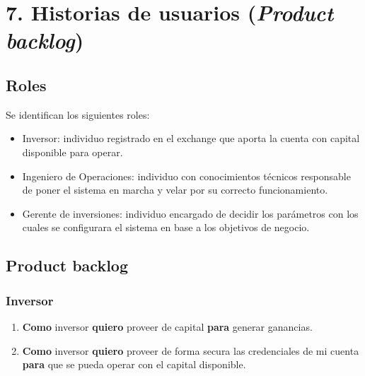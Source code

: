 \documentclass[
    11pt, %
]{charter}
\begin{document}
    \section{7. Historias de usuarios (\textit{Product backlog})}
    \subsection{Roles}
    Se identifican los siguientes roles:
    \begin{itemize}
    \item Inversor: individuo registrado en el exchange que aporta la cuenta con capital disponible para operar.
    \item Ingeniero de Operaciones: individuo con conocimientos técnicos responsable de poner el sistema en marcha y velar por su correcto funcionamiento.
    \item Gerente de inversiones: individuo encargado de decidir los parámetros con los cuales se configurara el sistema en base a los objetivos de negocio.
    \end{itemize}

    \label{sec:backlog}
    \subsection{Product backlog}
    \subsubsection{Inversor}
    \begin{enumerate}
    \item \textbf{Como} inversor \textbf{quiero} proveer de capital \textbf{para} generar ganancias.
    \item \textbf{Como} inversor \textbf{quiero} proveer de forma secura las credenciales de mi cuenta \textbf{para} que se pueda operar con el capital disponible.
    \end{enumerate}
\end{document}
